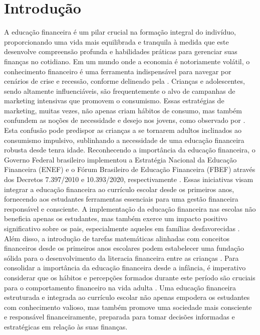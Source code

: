 \chapter{Introdução} 
A educação financeira é um pilar crucial na formação integral do indivíduo, proporcionando uma vida mais equilibrada e tranquila à medida que este desenvolve compreensão profunda e habilidades práticas para gerenciar suas finanças no cotidiano. Em um mundo onde a economia é notoriamente volátil, o conhecimento financeiro é uma ferramenta indispensável para navegar por cenários de crise e recessão, conforme delineado pela .
Crianças e adolescentes, sendo altamente influenciáveis, são frequentemente o alvo de campanhas de marketing intensivas que promovem o consumismo. Essas estratégias de marketing, muitas vezes, não apenas criam hábitos de consumo, mas também confundem as noções de necessidade e desejo nos jovens, como observado por . Esta confusão pode predispor as crianças a se tornarem adultos inclinados ao consumismo impulsivo, sublinhando a necessidade de uma educação financeira robusta desde tenra idade.
Reconhecendo a importância da educação financeira, o Governo Federal brasileiro implementou a Estratégia Nacional da Educação Financeira (ENEF) e o Fórum Brasileiro de Educação Financeira (FBEF) através dos Decretos 7.397/2010 e 10.393/2020, respectivamente \cite{decreto_10939}. Essas iniciativas visam integrar a educação financeira ao currículo escolar desde os primeiros anos, fornecendo aos estudantes ferramentas essenciais para uma gestão financeira responsável e consciente.
A implementação da educação financeira nas escolas não beneficia apenas os estudantes, mas também exerce um impacto positivo significativo sobre os pais, especialmente aqueles em famílias desfavorecidas \cite{Frisancho2023Spillover}. Além disso, a introdução de tarefas matemáticas alinhadas com conceitos financeiros desde os primeiros anos escolares podem estabelecer uma fundação sólida para o desenvolvimento da literacia financeira entre as crianças \cite{Ozkale2023Designing}.
Para consolidar a importância da educação financeira desde a infância, é imperativo considerar que os hábitos e percepções formados durante este período são cruciais para o comportamento financeiro na vida adulta \cite{AbuBakarAh2016Importance}. Uma educação financeira estruturada e integrada ao currículo escolar não apenas empodera os estudantes com conhecimento valioso, mas também promove uma sociedade mais consciente e responsável financeiramente, preparada para tomar decisões informadas e estratégicas em relação às suas finanças.

